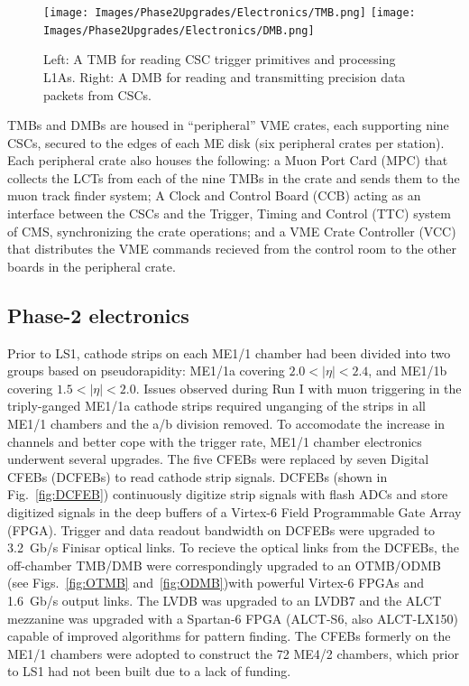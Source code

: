 \begin{figure}[H]
    \centering
    {\texttt{[image: Images/Phase2Upgrades/Electronics/TMB.png]}}
    {\texttt{[image: Images/Phase2Upgrades/Electronics/DMB.png]}}
    \caption{Left: A TMB for reading CSC trigger primitives and processing L1As. Right: A DMB for reading and transmitting precision data packets from CSCs.}
    \label{fig:TMBDMB}
\end{figure}

TMBs and DMBs are housed in ``peripheral'' VME crates, each supporting nine CSCs, secured to the edges of each ME disk (six peripheral crates per station). Each peripheral crate also houses the following: a Muon Port Card (MPC) that collects the LCTs from each of the nine TMBs in the crate and sends them to the muon track finder system; A Clock and Control Board (CCB) acting as an interface between the CSCs and the Trigger, Timing and Control (TTC) system of CMS, synchronizing the crate operations; and a VME Crate Controller (VCC) that distributes the VME commands recieved from the control room to the other boards in the peripheral crate.

\subsection{Phase-2 electronics} \label{sec:Phase2CSCelectronics}

Prior to LS1, cathode strips on each ME1/1 chamber had been divided into two groups based on pseudorapidity: ME1/1a covering $2.0 < |\eta|< 2.4$, and ME1/1b covering $1.5 < |\eta| < 2.0$. Issues observed during Run I with muon triggering in the triply-ganged ME1/1a cathode strips required unganging of the strips in all ME1/1 chambers and the a/b division removed. To accomodate the increase in channels and better cope with the trigger rate, ME1/1 chamber electronics underwent several upgrades. The five CFEBs were replaced by seven Digital CFEBs (DCFEBs) to read cathode strip signals. DCFEBs (shown in Fig.~\ref{fig:DCFEB}) continuously digitize strip signals with flash ADCs and store digitized signals in the deep buffers of a Virtex-6 Field Programmable Gate Array (FPGA). Trigger and data readout bandwidth on DCFEBs were upgraded to \SI{3.2}{Gb/s} Finisar optical links. To recieve the optical links from the DCFEBs, the off-chamber TMB/DMB were correspondingly upgraded to an OTMB/ODMB (see Figs.~\ref{fig:OTMB} and~\ref{fig:ODMB})with powerful Virtex-6 FPGAs and \SI{1.6}{Gb/s} output links. The LVDB was upgraded to an LVDB7 and the ALCT mezzanine was upgraded with a Spartan-6 FPGA (ALCT-S6, also ALCT-LX150) capable of improved algorithms for pattern finding. The CFEBs formerly on the ME1/1 chambers were adopted to construct the 72 ME4/2 chambers, which prior to LS1 had not been built due to a lack of funding.

